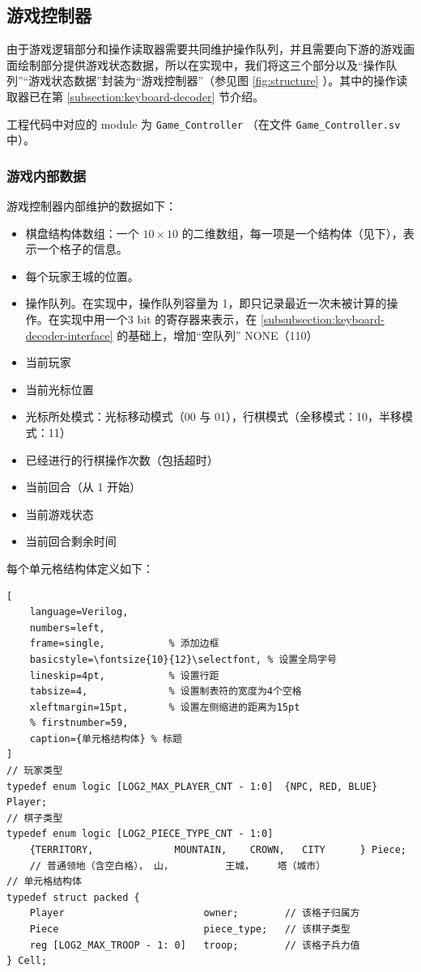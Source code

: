 \subsection{游戏控制器}
由于游戏逻辑部分和操作读取器需要共同维护操作队列，并且需要向下游的游戏画面绘制部分提供游戏状态数据，所以在实现中，我们将这三个部分以及“操作队列”“游戏状态数据”封装为“游戏控制器”（参见图 \ref{fig:structure} ）。其中的操作读取器已在第 \ref{subsection:keyboard-decoder} 节介绍。

工程代码中对应的 module 为 \texttt{Game\_Controller} （在文件 \texttt{Game\_Controller.sv} 中）。

\subsubsection{游戏内部数据}

游戏控制器内部维护的数据如下：
\begin{itemize}
    \item 棋盘结构体数组：一个 $10\times 10$ 的二维数组，每一项是一个结构体（见下），表示一个格子的信息。
    \item 每个玩家王城的位置。
    \item 操作队列。在实现中，操作队列容量为 1，即只记录最近一次未被计算的操作。在实现中用一个3 bit 的寄存器来表示，在 \ref{subsubsection:keyboard-decoder-interface} 的基础上，增加“空队列” NONE（110）
    \item 当前玩家
    \item 当前光标位置
    \item 光标所处模式：光标移动模式（00 与 01），行棋模式（全移模式：10，半移模式：11）
    \item 已经进行的行棋操作次数（包括超时）
    \item 当前回合（从 1 开始）
    \item 当前游戏状态
    \item 当前回合剩余时间
\end{itemize}

每个单元格结构体定义如下：
\begin{lstlisting}[
    language=Verilog,
    numbers=left,
    frame=single,           % 添加边框
    basicstyle=\fontsize{10}{12}\selectfont, % 设置全局字号
    lineskip=4pt,           % 设置行距
    tabsize=4,              % 设置制表符的宽度为4个空格
    xleftmargin=15pt,       % 设置左侧缩进的距离为15pt
    % firstnumber=59,
    caption={单元格结构体} % 标题
] 
// 玩家类型
typedef enum logic [LOG2_MAX_PLAYER_CNT - 1:0]  {NPC, RED, BLUE} Player;
// 棋子类型
typedef enum logic [LOG2_PIECE_TYPE_CNT - 1:0]  
    {TERRITORY,              MOUNTAIN,    CROWN,   CITY      } Piece;
    // 普通领地（含空白格）， 山，         王城，    塔（城市）
// 单元格结构体
typedef struct packed {
    Player                        owner;        // 该格子归属方
    Piece                         piece_type;   // 该棋子类型
    reg [LOG2_MAX_TROOP - 1: 0]   troop;        // 该格子兵力值
} Cell;
\end{lstlisting}

